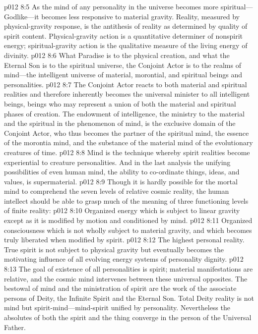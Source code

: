 \vs p012 8:5 As the mind of any personality in the universe becomes more spiritual---Godlike---it becomes less responsive to material gravity. Reality, measured by physical\hyp{}gravity response, is the antithesis of reality as determined by quality of spirit content. Physical\hyp{}gravity action is a quantitative determiner of nonspirit energy; spiritual\hyp{}gravity action is the qualitative measure of the living energy of divinity.
\pc \vs p012 8:6 What Paradise is to the physical creation, and what the Eternal Son is to the spiritual universe, the Conjoint Actor is to the realms of mind---the intelligent universe of material, morontial, and spiritual beings and personalities.
\vs p012 8:7 The Conjoint Actor reacts to both material and spiritual realities and therefore inherently becomes the universal minister to all intelligent beings, beings who may represent a union of both the material and spiritual phases of creation. The endowment of intelligence, the ministry to the material and the spiritual in the phenomenon of mind, is the exclusive domain of the Conjoint Actor, who thus becomes the partner of the spiritual mind, the essence of the morontia mind, and the substance of the material mind of the evolutionary creatures of time.
\vs p012 8:8 Mind is the technique whereby spirit realities become experiential to creature personalities. And in the last analysis the unifying possibilities of even human mind, the ability to co\hyp{}ordinate things, ideas, and values, is supermaterial.
\pc \vs p012 8:9 Though it is hardly possible for the mortal mind to comprehend the seven levels of relative cosmic reality, the human intellect should be able to grasp much of the meaning of three functioning levels of finite reality:
\pc \vs p012 8:10 \bibnobreakspace {} Organized energy which is subject to linear gravity except as it is modified by motion and conditioned by mind.
\vs p012 8:11 \bibnobreakspace {} Organized consciousness which is not wholly subject to material gravity, and which becomes truly liberated when modified by spirit.
\vs p012 8:12 \bibnobreakspace {} The highest personal reality. True spirit is not subject to physical gravity but eventually becomes the motivating influence of all evolving energy systems of personality dignity.
\pc \vs p012 8:13 The goal of existence of all personalities is spirit; material manifestations are relative, and the cosmic mind intervenes between these universal opposites. The bestowal of mind and the ministration of spirit are the work of the associate persons of Deity, the Infinite Spirit and the Eternal Son. Total Deity reality is not mind but spirit\hyp{}mind---mind\hyp{}spirit unified by personality. Nevertheless the absolutes of both the spirit and the thing converge in the person of the Universal Father.\plusone

